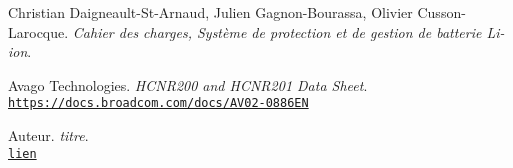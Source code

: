 \documentclass[12pt,letterpaper]{article}
\begin{document}
	
	\hypersetup{pageanchor=false}
	
	\newpage
	\hypersetup{pageanchor=true}
	\tableofcontents


	
	
	
	
	
	

	
		
	
	
	

	
	

	
	
	
	


	\begin{thebibliography}{10}
	
	Christian Daigneault-St-Arnaud, Julien Gagnon-Bourassa, Olivier Cusson-Larocque. \textit{Cahier des charges, Système de protection et de gestion de batterie Li-ion}. \par	
	
	Avago Technologies. \textit{HCNR200 and HCNR201 Data Sheet}.\\ \texttt{\url{https://docs.broadcom.com/docs/AV02-0886EN}}\par

	Auteur. \textit{titre}.\\ \texttt{\url{lien}}\par	
	
	
	\end{thebibliography}	
	
\end{document}
